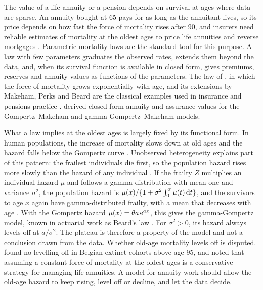 \documentclass[12pt]{article}
\newcommand{\e}{{\rm e}}         %
\newcommand{\dd}{{\rm d}}        %
\begin{document}
The value of a life annuity or a pension depends on survival at ages where data are sparse. An annuity bought at 65 pays for as long as the annuitant lives, so its price depends on how fast the force of mortality rises after 90, and insurers need reliable estimates of mortality at the oldest ages to price life annuities and reverse mortgages \citep{gbari2017extreme}. Parametric mortality laws are the standard tool for this purpose. A law with few parameters graduates the observed rates, extends them beyond the data, and, when its survival function is available in closed form, gives premiums, reserves and annuity values as functions of the parameters. The law of \citet{gompertz1825}, in which the force of mortality grows exponentially with age, and its extensions by Makeham, Perks and Beard are the classical examples used in insurance and pensions practice \citep[Section~5.9]{macdonald2018modelling}. \citet{castellares2022gompertz, castellares2024gamma} derived closed-form annuity and assurance values for the Gompertz--Makeham and gamma-Gompertz--Makeham models.

What a law implies at the oldest ages is largely fixed by its functional form. In human populations, the increase of mortality slows down at old ages and the hazard falls below the Gompertz curve \citep{vaupel1998biodemographic}. Unobserved heterogeneity explains part of this pattern: the frailest individuals die first, so the population hazard rises more slowly than the hazard of any individual \citep{vaupel1979impact}. If the frailty $Z$ multiplies an individual hazard $\mu$ and follows a gamma distribution with mean one and variance $\sigma^2$, the population hazard is $\mu(x)/\{1+\sigma^2\int_0^x\mu(t)\,\dd t\}$, and the survivors to age $x$ again have gamma-distributed frailty, with a mean that decreases with age \citep{vaupel1979impact}. With the Gompertz hazard $\mu(x)=\theta a\,\e^{ax}$, this gives the gamma-Gompertz model, known in actuarial work as Beard's law \citep[Table~5.1]{macdonald2018modelling}. For $\sigma^2>0$, its hazard always levels off at $a/\sigma^2$. The plateau is therefore a property of the model and not a conclusion drawn from the data. Whether old-age mortality levels off is disputed. \citet{gbari2017extreme} found no levelling off in Belgian extinct cohorts above age 95, and noted that assuming a constant force of mortality at the oldest ages is a conservative strategy for managing life annuities. A model for annuity work should allow the old-age hazard to keep rising, level off or decline, and let the data decide.
\end{document}
